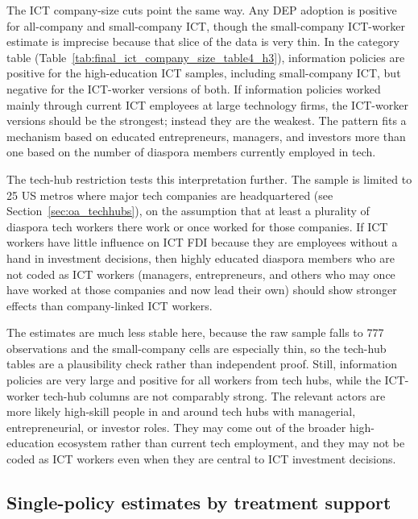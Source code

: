 \documentclass[12pt]{article}
\let\oldsubsection\subsection
\renewcommand{\subsection}{\FloatBarrier\oldsubsection}
\begin{document}
The ICT company-size cuts point the same way. Any DEP adoption is positive for all-company and small-company ICT, though the small-company ICT-worker estimate is imprecise because that slice of the data is very thin. In the category table (Table~\ref{tab:final_ict_company_size_table4_h3}), information policies are positive for the high-education ICT samples, including small-company ICT, but negative for the ICT-worker versions of both. If information policies worked mainly through current ICT employees at large technology firms, the ICT-worker versions should be the strongest; instead they are the weakest. The pattern fits a mechanism based on educated entrepreneurs, managers, and investors more than one based on the number of diaspora members currently employed in tech.




The tech-hub restriction tests this interpretation further. The sample is limited to 25 US metros where major tech companies are headquartered (see Section~\ref{sec:oa_techhubs}), on the assumption that at least a plurality of diaspora tech workers there work or once worked for those companies. If ICT workers have little influence on ICT FDI because they are employees without a hand in investment decisions, then highly educated diaspora members who are not coded as ICT workers (managers, entrepreneurs, and others who may once have worked at those companies and now lead their own) should show stronger effects than company-linked ICT workers.

The estimates are much less stable here, because the raw sample falls to 777 observations and the small-company cells are especially thin, so the tech-hub tables are a plausibility check rather than independent proof. Still, information policies are very large and positive for all workers from tech hubs, while the ICT-worker tech-hub columns are not comparably strong. The relevant actors are more likely high-skill people in and around tech hubs with managerial, entrepreneurial, or investor roles. They may come out of the broader high-education ecosystem rather than current tech employment, and they may not be coded as ICT workers even when they are central to ICT investment decisions.

\subsection{Single-policy estimates by treatment support}
\end{document}
